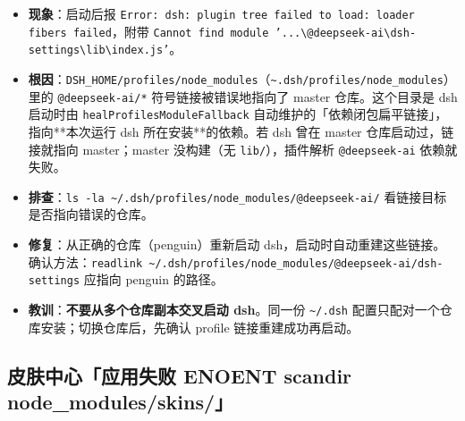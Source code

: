 \documentclass[11pt]{ctexart}
\newcommand{\code}[1]{\texttt{\small #1}}
\begin{document}
\begin{itemize}[itemsep=2pt]
  \item \textbf{现象}：启动后报 \code{Error: dsh: plugin tree failed to load: loader fibers failed}，附带 \code{Cannot find module '...\textbackslash @deepseek-ai\textbackslash dsh-settings\textbackslash lib\textbackslash index.js'}。
  \item \textbf{根因}：\code{\textdollar{}DSH\_HOME/profiles/node\_modules}（\code{\textasciitilde .dsh/profiles/node\_modules}）里的 \code{@deepseek-ai/*} 符号链接被错误地指向了 master 仓库。这个目录是 dsh 启动时由 \code{healProfilesModuleFallback} 自动维护的「依赖闭包扁平链接」，指向**本次运行 dsh 所在安装**的依赖。若 dsh 曾在 master 仓库启动过，链接就指向 master；master 没构建（无 \code{lib/}），插件解析 \code{@deepseek-ai} 依赖就失败。
  \item \textbf{排查}：\code{ls -la \textasciitilde/.dsh/profiles/node\_modules/@deepseek-ai/} 看链接目标是否指向错误的仓库。
  \item \textbf{修复}：从正确的仓库（penguin）重新启动 dsh，启动时自动重建这些链接。确认方法：\code{readlink \textasciitilde/.dsh/profiles/node\_modules/@deepseek-ai/dsh-settings} 应指向 penguin 的路径。
  \item \textbf{教训}：\textbf{不要从多个仓库副本交叉启动 dsh}。同一份 \code{\textasciitilde/.dsh} 配置只配对一个仓库安装；切换仓库后，先确认 profile 链接重建成功再启动。
\end{itemize}

\subsection{皮肤中心「应用失败 ENOENT scandir node\_modules/skins/」}
\end{document}

